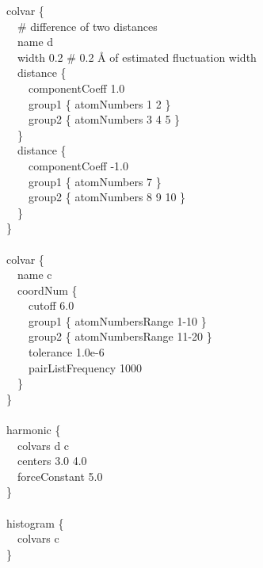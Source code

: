 \begin{cvexampleinput}
colvar \{\\
\-~~\# difference of two distances\\
\-~~name d \\
\-~~width 0.2  \# 0.2 \AA{} of estimated fluctuation width \\
\-~~distance \{\\
\-~~~~componentCoeff  1.0\\
\-~~~~group1 \{ atomNumbers 1 2 \}\\
\-~~~~group2 \{ atomNumbers 3 4 5 \}\\
\-~~\}\\
\-~~distance \{\\
\-~~~~componentCoeff -1.0\\
\-~~~~group1 \{ atomNumbers 7 \}\\
\-~~~~group2 \{ atomNumbers 8 9 10 \}\\
\-~~\}\\
\}\\
\\
colvar \{\\
\-~~name c\\
\-~~coordNum \{\\
\-~~~~cutoff 6.0\\
\-~~~~group1 \{ atomNumbersRange  1-10 \}\\
\-~~~~group2 \{ atomNumbersRange 11-20 \}\\
\-~~~~tolerance 1.0e-6\\
\-~~~~pairListFrequency 1000\\
\-~~\}\\
\}\\
\\
harmonic \{\\
\-~~colvars d c\\
\-~~centers 3.0 4.0\\
\-~~forceConstant 5.0\\
\}\\
\\
histogram \{\\
\-~~colvars c\\
\}
\end{cvexampleinput}



